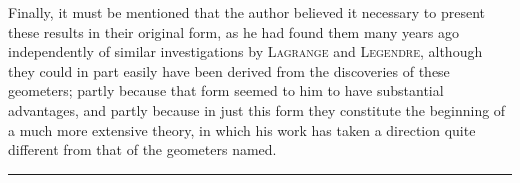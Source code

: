 \par
Finally, it must be mentioned that the author believed it necessary to present these results in their original form, as he had found them many years ago independently of similar investigations by \textsc{Lagrange} and \textsc{Legendre}, although they could in part easily have been derived from the discoveries of these geometers; partly because that form seemed to him to have substantial advantages, and partly because in just this form they constitute the beginning of a much more extensive theory, in which his work has taken a direction quite different from that of the geometers named.
\begin{center}\rule{0.25\linewidth}{0.4pt}\end{center}
\clearpage
\endgroup
